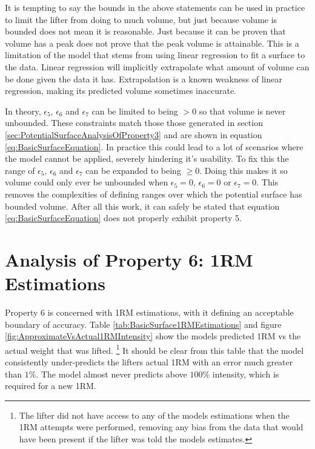 It is tempting to say the bounds in the above statements can be used in practice to limit the lifter from doing to much volume, but just because volume is bounded does not mean it is reasonable. Just because it can be proven that volume has a peak does not prove that the peak volume is attainable. This is a limitation of the model that stems from using linear regression to fit a surface to the data. Linear regression will implicitly extrapolate what amount of volume can be done given the data it has. Extrapolation is a known weakness of linear regression, making its predicted volume sometimes inaccurate.

In theory, $\epsilon_5$, $\epsilon_6$ and $\epsilon_7$ can be limited to being $> 0$ so that volume is never unbounded. These constraints match those those generated in section \ref{sec:PotentialSurfaceAnalysisOfProperty3} and are shown in equation \ref{eq:BasicSurfaceEquation}. In practice this could lead to a lot of scenarios where the model cannot be applied, severely hindering it's usability. To fix this the range of $\epsilon_5$, $\epsilon_6$ and $\epsilon_7$ can be expanded to being $\ge 0$. Doing this makes it so volume could only ever be unbounded when $\epsilon_5=0$, $\epsilon_6=0$ or $\epsilon_7=0$. This removes the complexities of defining ranges over which the potential surface has bounded volume. After all this work, it can safely be stated that equation \ref{eq:BasicSurfaceEquation} does not properly exhibit property 5.

\section{Analysis of Property 6: 1RM Estimations}
\label{sec:PotentialSurface1RMEstimations}

Property 6 is concerned with 1RM estimations, with it defining an acceptable boundary of accuracy. Table \ref{tab:BasicSurface1RMEstimations} and figure \ref{fig:ApproximateVsActual1RMIntensity} show the models predicted 1RM vs the actual weight that was lifted. \footnote{The lifter did not have access to any of the models estimations when the 1RM attempts were performed, removing any bias from the data that would have been present if the lifter was told the models estimates.} It should be clear from this table that the model consistently under-predicts the lifters actual 1RM with an error much greater than $1\%$. The model almost never predicts above $100\%$ intensity, which is required for a new 1RM.

